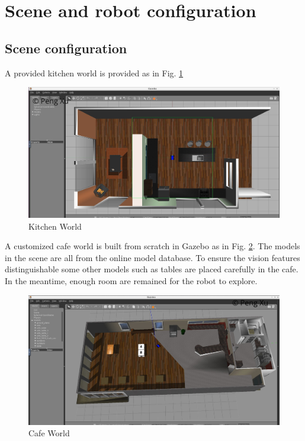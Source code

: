 \documentclass[10pt,journal,compsoc]{IEEEtran}
\begin{document}
\section{Scene and robot configuration}

\subsection{Scene configuration}

A provided kitchen world is provided as in Fig. \ref{fig:kitchen-gazebo}

\begin{figure}[thpb]
      \centering
      \includegraphics[width=\linewidth]{images/kitchen-gazebo.png}
      \caption{Kitchen World}
      \label{fig:kitchen-gazebo}
\end{figure}

A customized cafe world is built from scratch in Gazebo as in Fig. \ref{fig:cafe-gazebo}. The models in the scene are all from the online model database. To ensure the vision features distinguishable some other models such as tables are placed carefully in the cafe. In the meantime, enough room are remained for the robot to explore.

\begin{figure}[thpb]
      \centering
      \includegraphics[width=\linewidth]{images/cafe-gazebo.png}
      \caption{Cafe World}
      \label{fig:cafe-gazebo}
\end{figure}
\end{document}
